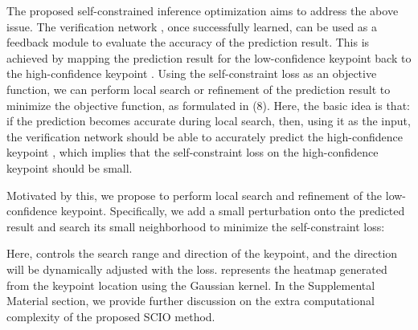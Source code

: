 \documentclass[runningheads]{llncs}
\begin{document}
The proposed self-constrained inference optimization aims to address the above issue. The verification network , once successfully learned, can be used as a feedback module to evaluate the accuracy of the prediction result. This is achieved by mapping the prediction result  for the low-confidence keypoint back to the high-confidence keypoint . Using the self-constraint loss as an objective function, we can perform local search or refinement of the prediction result  to minimize the objective function, as formulated in (8). 
Here, the basic idea is that: if the prediction  becomes accurate during local search, then, using it as the input, the verification network should be able to accurately predict the high-confidence keypoint , which implies that the 
self-constraint loss  on the high-confidence keypoint  should be small.   

Motivated by this, we propose to perform local search and refinement of the low-confidence keypoint. Specifically, we add a small perturbation  onto the predicted result 
 and search its small neighborhood to minimize the self-constraint loss:


Here,  controls the search range and direction of the keypoint, and the direction will be dynamically adjusted with the loss.
 represents the heatmap generated from the keypoint location  using the Gaussian kernel.
In the Supplemental Material section, we provide further discussion on the extra computational complexity of the proposed SCIO method. 
\end{document}
